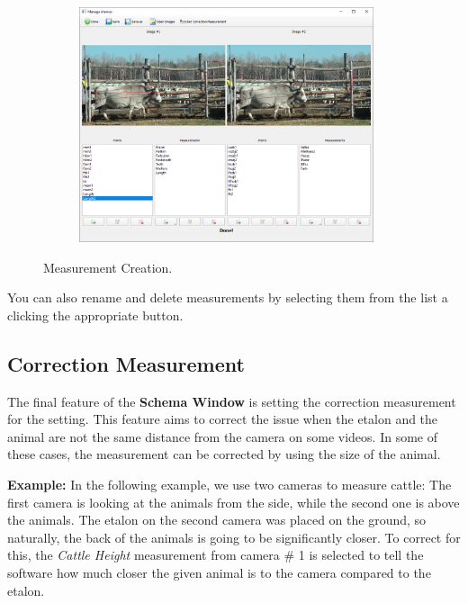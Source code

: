 \documentclass[10pt,a4paper,oneside]{report}             %
\begin{document}
\begin{figure}[H]
	\centering
	\begin{subfigure}{\textwidth}
		\centering 
		\includegraphics[width=0.95\textwidth]{./images/SchemDist.png}
	\end{subfigure}
	\caption[]
	{\small  Measurement Creation.}
\end{figure} 

You can also rename and delete measurements by selecting them from the list a clicking the appropriate button.

\subsection{Correction Measurement}

The final feature of  the \textbf{Schema Window} is setting the correction measurement for the  setting. This feature aims to correct the issue when the etalon and the animal are not the same distance from the camera on some videos. In some of these cases, the measurement can be corrected by using the size of the animal.

\textbf{Example:} In the following example, we use two cameras to measure cattle: The first camera is looking at the animals from the side, while the second one is above the animals. The etalon on the second camera was placed on the ground, so naturally, the back of the animals is going to be significantly closer. To correct for this, the \textit{Cattle Height} measurement from camera \# 1 is selected to tell the software how much closer the given animal is to the camera compared to the etalon.
\end{document}
